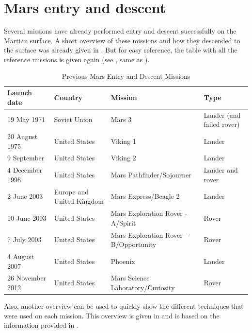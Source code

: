 \chapter{Mars entry and descent}
\label{ch:entry}
Several missions have already performed entry and descent successfully  on the Martian surface. A short overview of these missions and how they descended to the surface was already given in . But for easy reference, the table with all the reference missions is given again (see , same as ).

\begin{table}[!ht]
\begin{center}
\caption{Previous Mars Entry and Descent Missions}
\label{tab:mslprevmis_copy}
\begin{tabular}{|l|l|l|l|}
\hline 
\textbf{Launch date} 		& \textbf{Country} & \textbf{Mission} & \textbf{Type} \\ \hline \hline
19 May 1971	& Soviet Union & Mars 3 & Lander (and failed rover)  \\ \hline
20 August 1975	& United States & Viking 1 & Lander \\ \hline
9 September	& United States & Viking 2 & Lander \\ \hline
4 December 1996	& United States & Mars Pathfinder/Sojourner & Lander and rover \\ \hline
2 June 2003	& Europe and United Kingdom & Mars Express/Beagle 2 & Lander \\ \hline
10 June 2003 & United States & Mars Exploration Rover - A/Spirit & Rover \\ \hline
7 July 2003	& United States & Mars Exploration Rover - B/Opportunity & Rover \\ \hline
4 August 2007 & United States & Phoenix & Lander \\ \hline
26 November 2012 & United States & Mars Science Laboratory/Curiosity & Rover \\ \hline
\end{tabular}
\end{center}
\end{table}

Also, another overview can be used to quickly show the different techniques that were used on each mission. This overview is given in  and is based on the information provided in .

